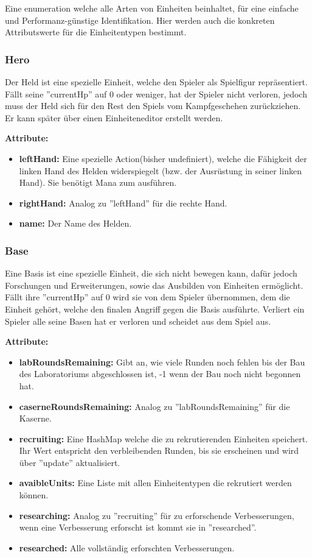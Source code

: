 \documentclass[fontsize=12pt,paper=a4,twoside]{scrartcl}
\begin{document}
Eine enumeration welche alle Arten von Einheiten beinhaltet, für eine einfache und Performanz-günstige Identifikation. Hier werden auch die konkreten Attributswerte für die Einheitentypen bestimmt.

\subsubsection{Hero}

Der Held ist eine spezielle Einheit, welche den Spieler als Spielfigur repräsentiert. Fällt seine ''currentHp'' auf 0 oder weniger, hat der Spieler nicht verloren, jedoch muss der Held sich für den Rest den Spiels vom Kampfgeschehen zurückziehen. Er kann später über einen Einheiteneditor erstellt werden.

\textbf{Attribute:}
\begin{itemize}
\item \textbf{leftHand:} Eine spezielle Action(bisher undefiniert), welche die Fähigkeit der linken Hand des Helden widerspiegelt (bzw. der Ausrüstung in seiner linken Hand). Sie benötigt Mana zum ausführen.
\item \textbf{rightHand:} Analog zu ''leftHand'' für die rechte Hand.
\item \textbf{name:} Der Name des Helden.
\end{itemize}

\subsubsection{Base}
Eine Basis ist eine spezielle Einheit, die sich nicht bewegen kann, dafür jedoch Forschungen und Erweiterungen, sowie das Ausbilden von Einheiten ermöglicht. Fällt ihre ''currentHp'' auf 0 wird sie von dem Spieler übernommen, dem die Einheit gehört, welche den finalen Angriff gegen die Basis ausführte. Verliert ein Spieler alle seine Basen hat er verloren und scheidet aus dem Spiel aus.

\textbf{Attribute:}
\begin{itemize}
\item \textbf{labRoundsRemaining:} Gibt an, wie viele Runden noch fehlen bis der Bau des Laboratoriums abgeschlossen ist, -1 wenn der Bau noch nicht begonnen hat.
\item \textbf{caserneRoundsRemaining:} Analog zu ''labRoundsRemaining'' für die Kaserne.
\item \textbf{recruiting:} Eine HashMap welche die zu rekrutierenden Einheiten speichert. Ihr Wert entspricht den verbleibenden Runden, bis sie erscheinen und wird über ''update'' aktualisiert.
\item \textbf{avaibleUnits:} Eine Liste mit allen Einheitentypen die rekrutiert werden können.
\item \textbf{researching:} Analog zu ''recruiting'' für zu erforschende Verbesserungen, wenn eine Verbesserung erforscht ist kommt sie in ''researched''.
\item \textbf{researched:} Alle vollständig erforschten Verbesserungen.
\end{itemize}
\end{document}
